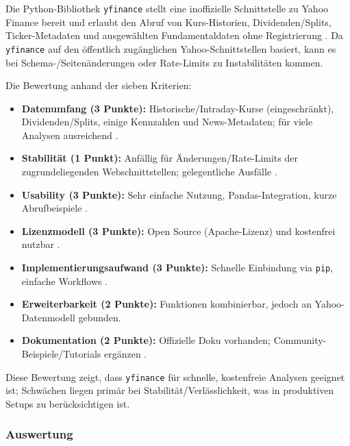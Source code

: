       Die Python-Bibliothek \texttt{yfinance} stellt eine inoffizielle Schnittstelle zu Yahoo Finance bereit und erlaubt den Abruf von Kurs-Historien, Dividenden/Splits, Ticker-Metadaten und ausgewählten Fundamentaldaten ohne Registrierung \autocite{yfinanceDocs}.
      Da \texttt{yfinance} auf den öffentlich zugänglichen Yahoo-Schnittstellen basiert, kann es bei Schema-/Seitenänderungen oder Rate-Limits zu Instabilitäten kommen.

      Die Bewertung anhand der sieben Kriterien:
      \begin{itemize}
        \item \textbf{Datenumfang (3 Punkte):} Historische/Intraday-Kurse (eingeschränkt), Dividenden/Splits, einige Kennzahlen und News-Metadaten; für viele Analysen ausreichend \autocite{yfinanceDocs}.
        \item \textbf{Stabilität (1 Punkt):} Anfällig für Änderungen/Rate-Limits der zugrundeliegenden Webschnittstellen; gelegentliche Ausfälle \autocite{yfinanceDocs}.
        \item \textbf{Usability (3 Punkte):} Sehr einfache Nutzung, Pandas-Integration, kurze Abrufbeispiele \autocite{yfinanceDocs}.
        \item \textbf{Lizenzmodell (3 Punkte):} Open Source (Apache-Lizenz) und kostenfrei nutzbar \autocite{yfinanceDocs}.
        \item \textbf{Implementierungsaufwand (3 Punkte):} Schnelle Einbindung via \texttt{pip}, einfache Workflows \autocite{yfinanceDocs}.
        \item \textbf{Erweiterbarkeit (2 Punkte):} Funktionen kombinierbar, jedoch an Yahoo-Datenmodell gebunden.
        \item \textbf{Dokumentation (2 Punkte):} Offizielle Doku vorhanden; Community-Beispiele/Tutorials ergänzen \autocite{yfinanceDocs}.
      \end{itemize}

      Diese Bewertung zeigt, dass \texttt{yfinance} für schnelle, kostenfreie Analysen geeignet ist; Schwächen liegen primär bei Stabilität/Verlässlichkeit, was in produktiven Setups zu berücksichtigen ist.

      \global\def\VyfinanceDaten{3}
      \global\def\VyfinanceStabilität{1}
      \global\def\VyfinanceUsability{3}
      \global\def\VyfinanceLizenz{3}
      \global\def\VyfinanceImplement{3}
      \global\def\VyfinanceErweiterung{2}
      \global\def\VyfinanceDokumentation{2}

    \subsubsection{Auswertung}

